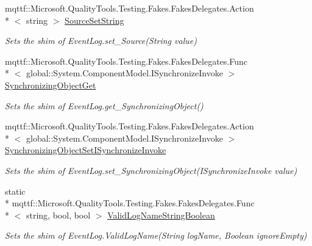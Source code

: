 \begin{DoxyCompactItemize}
mqttf\-::\-Microsoft.\-Quality\-Tools.\-Testing.\-Fakes.\-Fakes\-Delegates.\-Action\\*
$<$ string $>$ \hyperlink{class_system_1_1_diagnostics_1_1_fakes_1_1_shim_event_log_ab09c98fb1797cdf543cbd35dadddd960}{Source\-Set\-String}
\begin{DoxyCompactList}\small\item\em Sets the shim of Event\-Log.\-set\-\_\-\-Source(\-String value)\end{DoxyCompactList}\item 
mqttf\-::\-Microsoft.\-Quality\-Tools.\-Testing.\-Fakes.\-Fakes\-Delegates.\-Func\\*
$<$ global\-::\-System.\-Component\-Model.\-I\-Synchronize\-Invoke $>$ \hyperlink{class_system_1_1_diagnostics_1_1_fakes_1_1_shim_event_log_af5a39eae25a50809788b977d737cebb0}{Synchronizing\-Object\-Get}
\begin{DoxyCompactList}\small\item\em Sets the shim of Event\-Log.\-get\-\_\-\-Synchronizing\-Object()\end{DoxyCompactList}\item 
mqttf\-::\-Microsoft.\-Quality\-Tools.\-Testing.\-Fakes.\-Fakes\-Delegates.\-Action\\*
$<$ global\-::\-System.\-Component\-Model.\-I\-Synchronize\-Invoke $>$ \hyperlink{class_system_1_1_diagnostics_1_1_fakes_1_1_shim_event_log_a958c348387c001ae4e95bd75e72f6e9a}{Synchronizing\-Object\-Set\-I\-Synchronize\-Invoke}
\begin{DoxyCompactList}\small\item\em Sets the shim of Event\-Log.\-set\-\_\-\-Synchronizing\-Object(\-I\-Synchronize\-Invoke value)\end{DoxyCompactList}\item 
static \\*
mqttf\-::\-Microsoft.\-Quality\-Tools.\-Testing.\-Fakes.\-Fakes\-Delegates.\-Func\\*
$<$ string, bool, bool $>$ \hyperlink{class_system_1_1_diagnostics_1_1_fakes_1_1_shim_event_log_a83049c126db726109948d2b0327c7c57}{Valid\-Log\-Name\-String\-Boolean}
\begin{DoxyCompactList}\small\item\em Sets the shim of Event\-Log.\-Valid\-Log\-Name(\-String log\-Name, Boolean ignore\-Empty)\end{DoxyCompactList}\item 

\end{DoxyCompactItemize}
